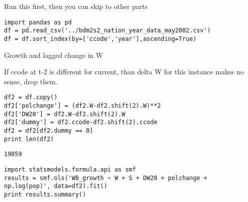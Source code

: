 \documentclass[12pt,fleqn]{article}\usepackage{common}
\begin{document}

Run this first, then you can skip to other parts

\begin{verbatim}
import pandas as pd
df = pd.read_csv('../bdm2s2_nation_year_data_may2002.csv')
df = df.sort_index(by=['ccode','year'],ascending=True)
\end{verbatim}



Growth and lagged change in W

If ccode at t-2 is different for current, than delta W for this instance
makes no sense, drop them.

\begin{verbatim}
df2 = df.copy()
df2['polchange'] = (df2.W-df2.shift(2).W)**2
df2['DW20'] = df2.W-df2.shift(2).W
df2['dummy'] = df2.ccode-df2.shift(2).ccode
df2 = df2[df2.dummy == 0]
print len(df2)
\end{verbatim}

\begin{verbatim}
19059
\end{verbatim}

\begin{verbatim}
import statsmodels.formula.api as smf
results = smf.ols('WB_growth ~ W + S + DW20 + polchange + np.log(pop)', data=df2).fit()
print results.summary()
\end{verbatim}
\end{document}
